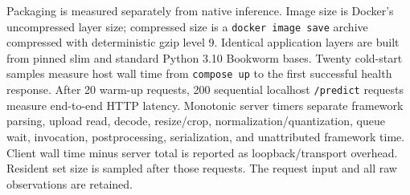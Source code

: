 Packaging is measured separately from native inference. Image size is Docker's uncompressed layer size; compressed size is a \texttt{docker image save} archive compressed with deterministic gzip level 9. Identical application layers are built from pinned slim and standard Python 3.10 Bookworm bases. Twenty cold-start samples measure host wall time from \texttt{compose up} to the first successful health response. After 20 warm-up requests, 200 sequential localhost \texttt{/predict} requests measure end-to-end HTTP latency. Monotonic server timers separate framework parsing, upload read, decode, resize/crop, normalization/quantization, queue wait, invocation, postprocessing, serialization, and unattributed framework time. Client wall time minus server total is reported as loopback/transport overhead. Resident set size is sampled after those requests. The request input and all raw observations are retained.
